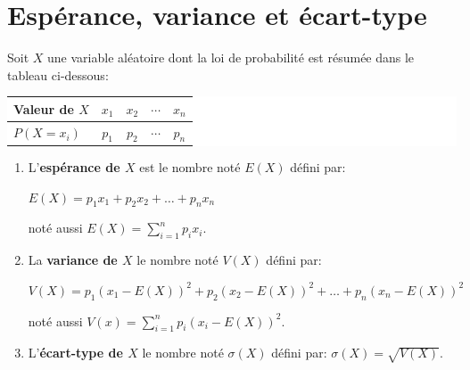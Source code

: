 \documentclass[a4paper,11pt,cours]{nsi} %
\begin{document}
\section{Espérance, variance et écart-type}
\begin{definition}
	Soit $X$ une variable aléatoire dont la loi de probabilité est résumée dans le tableau ci-dessous:
	\begin{center}
		\colorbox{white}{
			\begin{tabular}{|l|c|c|c|c|}
				\hline
				\textbf{{\boldmath Valeur de $X$}} & $x_1$ & $x_2$ & $\cdots$ & $x_n$\\
				\hline
				{\boldmath $P(X=x_i)$} & $p_1$ & $p_2$ & $\cdots$ & $p_n$\\
				\hline
		\end{tabular}}
	\end{center}
	
	\begin{enumerate}[label=\textbullet]
		\item	L'\textbf{{\boldmath espérance de $X$}} est le nombre noté {\boldmath $E(X)$} défini par:\\
		\centerline{{\boldmath $E(X)=p_1 x_1+p_2 x_2+\ldots+p_n x_n$}} 
		noté aussi {\boldmath $E(X)=\displaystyle \sum_{i=1}^{n} p_i x_i$}.
		\item La 	\textbf{{\boldmath variance de $X$}} le nombre noté {\boldmath $V(X)$} défini par:\\
		\centerline{{\boldmath $V(X)=p_1 \left(x_1-E(X)\right)^2+p_2 \left(x_2-E(X)\right)^2+\ldots+p_n \left(x_n-E(X)\right)^2$}}
		noté aussi {\boldmath $V(x)=\displaystyle \sum_{i=1}^{n} p_i\left(x_i-E(X)\right)^2$}.
		\item  L'\textbf{{\boldmath écart-type de $X$}} le nombre noté {\boldmath $\sigma(X)$} défini par: {\boldmath $\sigma(X)=\sqrt{V(X)}$}.
	\end{enumerate}
\end{definition}
\end{document}
